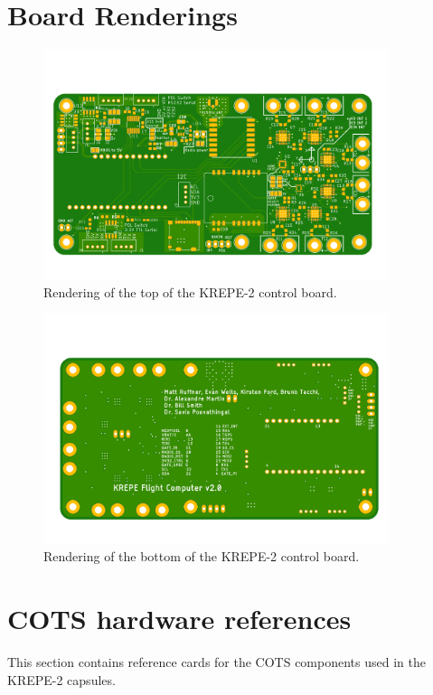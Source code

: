 \documentclass{article}
\begin{document}
\section{Board Renderings}
\begin{figure}[H]
	\centering
	\includegraphics[width=0.9\textwidth]{images/main_board-top.png}
	\caption{Rendering of the top of the KREPE-2 control board.}
	\label{fig:board-top}
\end{figure}
\begin{figure}[H]
	\centering
	\includegraphics[width=0.9\textwidth]{images/main_board-bottom.png}
	\caption{Rendering of the bottom of the KREPE-2 control board.}
	\label{fig:board-bottom}
\end{figure}


\section{COTS hardware references}
This section contains reference cards for the COTS components used in the KREPE-2 capsules.
\end{document}
